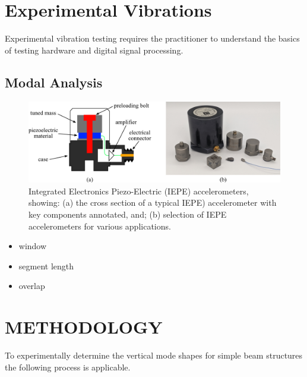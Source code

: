 \documentclass[12pt,letter]{article}
\numberwithin{ex}{section} %
\numberwithin{re}{section} %
\begin{document}
	
	\setcounter{section}{8}	
	\setcounter{figure}{0}   
	\renewcommand\thefigure{\thesection.\arabic{figure}}
	\setcounter{equation}{0}   
	\renewcommand\theequation{\thesection.\arabic{equation}}

	\section{Experimental Vibrations}
	
Experimental vibration testing requires the practitioner to understand the basics of testing hardware and digital signal processing.

\subsection{Modal Analysis}


\begin{figure}[H]
    \centering
    \includegraphics[]{figures/accelerometers.png}
    \caption{Integrated Electronics Piezo-Electric (IEPE) accelerometers, showing: (a) the cross section of a typical IEPE) accelerometer with key components annotated, and; (b) selection of IEPE accelerometers for various applications.}
    \label{fig:accelerometers}
\end{figure} 

\begin{itemize}
\item window
\item segment length
\item overlap
\end{itemize}

\maketitle
\section{METHODOLOGY}
To experimentally determine the vertical mode shapes for simple beam structures the following process is applicable. 
\end{document}
